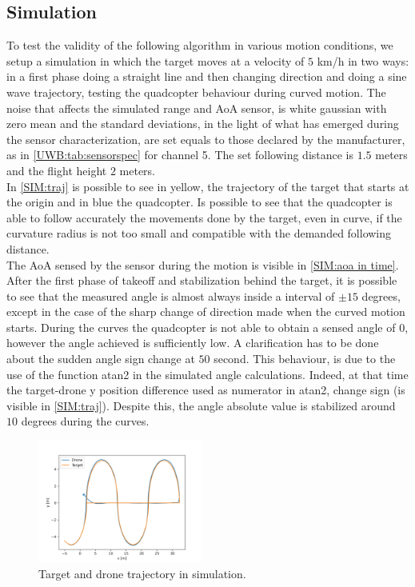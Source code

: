 \subsection{Simulation}\label{SIM_RES}
To test the validity of the following algorithm in various motion conditions, we setup a simulation in which the target moves at a velocity of $5$ km/h in two ways: in a first phase doing a straight line and then changing direction and doing a sine wave trajectory, testing the quadcopter behaviour during curved motion. The noise that affects the simulated range and AoA sensor, is white gaussian with zero mean and the standard deviations, in the light of what has emerged during the sensor characterization, are set equals to those declared by the manufacturer, as in \autoref{UWB:tab:sensorspec} for channel 5. The set following distance is $1.5$ meters and the flight height $2$ meters.\\
In \autoref{SIM:traj} is possible to see in yellow, the trajectory of the target that starts at the origin and in blue the quadcopter. Is possible to see that the quadcopter is able to follow accurately the movements done by the target, even in curve, if the curvature radius is not too small and compatible with the demanded following distance.\\

The AoA sensed by the sensor during the motion is visible in \autoref{SIM:aoa in time}. After the first phase of takeoff and stabilization behind the target, it is possible to see that the measured angle is almost always inside a interval of $\pm 15$ degrees, except in the case of the sharp change of direction made when the curved motion starts. During the curves the quadcopter is not able to obtain a sensed angle of $0$, however the angle achieved is sufficiently low. A clarification has to be done about the sudden angle sign change at $50$ second. This behaviour, is due to the use of the function atan2 in the simulated angle calculations. Indeed, at that time the target-drone y position difference used as numerator in atan2, change sign (is visible in \autoref{SIM:traj}). Despite this, the angle absolute value is stabilized around $10$ degrees during the curves.\\

\begin{figure}
    \centering
    \includegraphics[width=0.48\textwidth]{images/Simulation/Drone_Target x-y Position.png}
    \caption{Target and drone trajectory in simulation.}
    \label{SIM:traj}
\end{figure}

